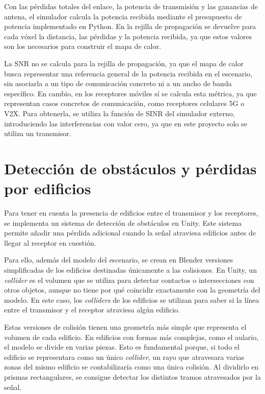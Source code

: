 Con las pérdidas totales del enlace, la potencia de transmisión y las ganancias de antena, el simulador calcula la potencia recibida mediante el presupuesto de potencia implementado en Python. En la rejilla de propagación se devuelve para cada vóxel la distancia, las pérdidas y la potencia recibida, ya que estos valores son los necesarios para construir el mapa de calor.

La SNR no se calcula para la rejilla de propagación, ya que el mapa de calor busca representar una referencia general de la potencia recibida en el escenario, sin asociarla a un tipo de comunicación concreto ni a un ancho de banda específico. En cambio, en los receptores móviles sí se calcula esta métrica, ya que representan casos concretos de comunicación, como receptores celulares 5G o V2X. Para obtenerla, se utiliza la función de SINR del simulador externo, introduciendo las interferencias con valor cero, ya que en este proyecto solo se utiliza un transmisor.


\section{Detección de obstáculos y pérdidas por edificios}

Para tener en cuenta la presencia de edificios entre el transmisor y los receptores, se implementa un sistema de detección de obstáculos en Unity. Este sistema permite añadir una pérdida adicional cuando la señal atraviesa edificios antes de llegar al receptor en cuestión.

Para ello, además del modelo del escenario, se crean en Blender versiones simplificadas de los edificios destinadas únicamente a las colisiones. En Unity, un \textit{collider} es el volumen que se utiliza para detectar contactos o intersecciones con otros objetos, aunque no tiene por qué coincidir exactamente con la geometría del modelo. En este caso, los \textit{colliders} de los edificios se utilizan para saber si la línea entre el transmisor y el receptor atraviesa algún edificio.

Estas versiones de colisión tienen una geometría más simple que representa el volumen de cada edificio. En edificios con formas más complejas, como el aulario, el modelo se divide en varias piezas. Esto es fundamental porque, si todo el edificio se representara como un único \textit{collider}, un rayo que atravesara varias zonas del mismo edificio se contabilizaría como una única colisión. Al dividirlo en prismas rectangulares, se consigue detectar los distintos tramos atravesados por la señal.

